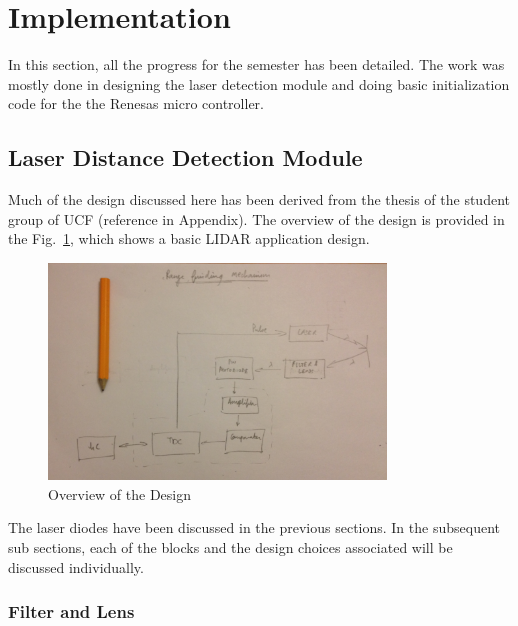 \documentclass[11pt]{article}
\begin{document}
\newpage{}

\section{Implementation}

In this section, all the progress for the semester has been detailed. The work was mostly done in designing the laser detection module and doing basic initialization code for the the Renesas micro controller. 

\subsection{Laser Distance Detection Module}

Much of the design discussed here has been derived from the thesis of the student group of UCF (reference in Appendix). The overview of the design is provided in the Fig.~\ref{overview}, which shows a basic LIDAR application design.

\begin{figure}[!h]
\centering
\includegraphics[width=0.8\textwidth]{overview.png}
\caption{Overview of the Design}
\label{overview}
\end{figure}

The laser diodes have been discussed in the previous sections. In the subsequent sub sections, each of the blocks and the design choices associated will be discussed individually.

\subsubsection{Filter and Lens}
















 
\end{document}
